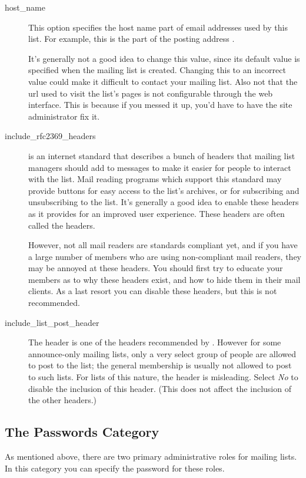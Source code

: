 \documentclass{howto}
\begin{document}
\begin{description}
\item[host_name]
    This option specifies the host name part of email addresses used
    by this list.  For example, this is the  part of
    the posting address .

    It's generally not a good idea to change this value, since its
    default value is specified when the mailing list is created.
    Changing this to an incorrect value could make it difficult to
    contact your mailing list.  Also not that the url used to visit
    the list's pages is not configurable through the web interface.
    This is because if you messed it up, you'd have to have the site
    administrator fix it.

\item[include_rfc2369_headers]
     is an internet standard that describes a bunch of
    headers that mailing list managers should add to messages to make
    it easier for people to interact with the list.  Mail reading
    programs which support this standard may provide buttons for easy
    access to the list's archives, or for subscribing and
    unsubscribing to the list.  It's generally a good idea to enable
    these headers as it provides for an improved user experience.
    These headers are often called the  headers.

    However, not all mail readers are standards compliant yet, and if
    you have a large number of members who are using non-compliant
    mail readers, they may be annoyed at these headers.  You should
    first try to educate your members as to why these headers exist,
    and how to hide them in their mail clients.  As a last resort you
    can disable these headers, but this is not recommended.

\item[include_list_post_header]
    The  header is one of the headers
    recommended by .  However for some announce-only mailing
    lists, only a very select group of people are allowed to post to
    the list; the general membership is usually not allowed to post to
    such lists.  For lists of this nature, the 
    header is misleading.  Select \emph{No} to disable the inclusion
    of this header. (This does not affect the inclusion of the other
     headers.)
\end{description}

\subsection{The Passwords Category}
As mentioned above, there are two primary administrative roles for
mailing lists.  In this category you can specify the password for
these roles.
\end{document}
